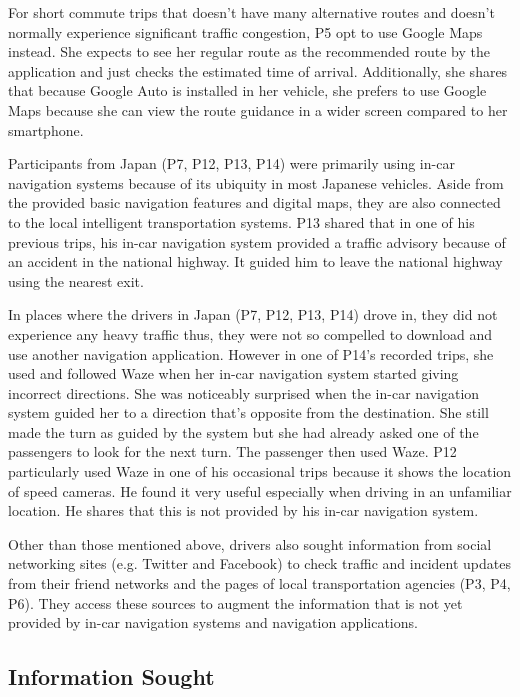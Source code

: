 For short commute trips that doesn't have many alternative routes and doesn't normally experience significant traffic congestion, P5 opt to use Google Maps instead. She expects to see her regular route as the recommended route by the application and just checks the estimated time of arrival. Additionally, she shares that because Google Auto is installed in her vehicle, she prefers to use Google Maps because she can view the route guidance in a wider screen compared to her smartphone. 

Participants from Japan (P7, P12, P13, P14) were primarily using in-car navigation systems because of its ubiquity in most Japanese vehicles. Aside from the provided basic navigation features and digital maps, they are also connected to the local intelligent transportation systems. P13 shared that in one of his previous trips, his in-car navigation system provided a traffic advisory because of an accident in the national highway. It guided him to leave the national highway using the nearest exit.  

In places where the drivers in Japan (P7, P12, P13, P14) drove in, they did not experience any heavy traffic thus, they were not so compelled to download and use another navigation application. However in one of P14's recorded trips, she used and followed Waze when her in-car navigation system started giving incorrect directions. She was noticeably surprised when the in-car navigation system guided her to a direction that's opposite from the destination. She still made the turn as guided by the system but she had already asked one of the passengers to look for the next turn. The passenger then used Waze. P12 particularly used Waze in one of his occasional trips because it shows the location of speed cameras. He found it very useful especially when driving in an unfamiliar location. He shares that this is not provided by his in-car navigation system. 

Other than those mentioned above, drivers also sought information from social networking sites (e.g. Twitter and Facebook) to check traffic and incident updates from their friend networks and the pages of local transportation agencies (P3, P4, P6). They access these sources to augment the information that is not yet provided by in-car navigation systems and navigation applications. 

\subsection{Information Sought}

